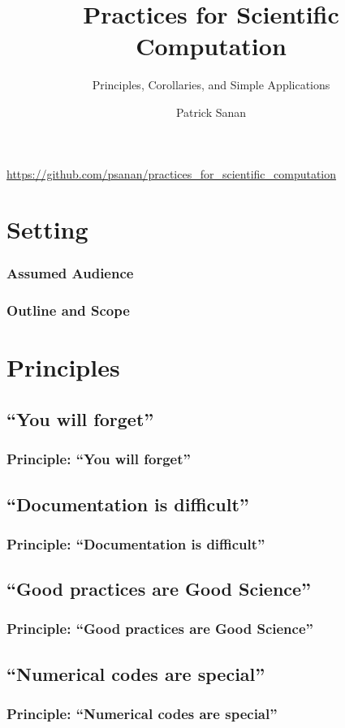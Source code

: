 \documentclass{beamer}
\author{Patrick Sanan}
\institute[ETHZ]
{
ETH Zurich\\
\href{mailto:patrick.sanan@erdw.ethz.ch}{patrick.sanan@erdw.ethz.ch}
}
\title{Practices for Scientific Computation}
\subtitle[]{Principles, Corollaries, and Simple Applications}
\date[]{}
\begin{document}
\begin{frame}[fragile]
\titlepage
\begin{center}
\href{https://github.com/psanan/git_tutorial}{https://github.com/psanan/practices\_for\_scientific\_computation}
\end{center}
\end{frame}

\begin{frame}
\tableofcontents
\end{frame}

\section{Setting}

\begin{frame}[fragile]
\frametitle{Assumed Audience}
\end{frame}

\begin{frame}[fragile]
\frametitle{Outline and Scope}
\end{frame}

\section{Principles}

\subsection{``You will forget''}
\begin{frame}[fragile]
\frametitle{Principle: ``You will forget''}
\end{frame}

\subsection{``Documentation is difficult''}
\begin{frame}[fragile]
\frametitle{Principle: ``Documentation is difficult''}
\end{frame}

\subsection{``Good practices are Good Science''}
\begin{frame}[fragile]
\frametitle{Principle: ``Good practices are Good Science''}
\end{frame}

\subsection{``Numerical codes are special''}
\begin{frame}[fragile]
\frametitle{Principle: ``Numerical codes are special''}
\end{frame}
\end{document}
